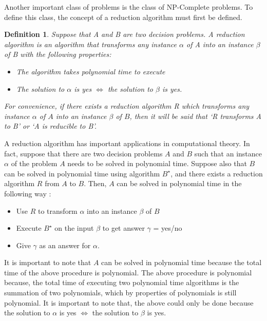 \documentclass[12pt]{article}
\newtheorem{definition}{Definition}[subsection]
\numberwithin{equation}{subsection}
\numberwithin{table}{subsection}
\numberwithin{algorithm}{subsection}
\begin{document}
Another important class of problems is the class of NP-Complete problems. To define this class, the concept of a reduction algorithm must first be defined.
\begin{definition}
\label{reduction_algorithm}
Suppose that A and B are two decision problems. A reduction algorithm is an algorithm that transforms any instance $\alpha$ of A into an instance $\beta$ of B with the following properties:
\begin{itemize}
   \item The algorithm takes polynomial time to execute
   \item The solution to $\alpha$ is yes $\iff$ the solution to $\beta$ is yes.
\end{itemize} 
For convenience, if there exists a reduction algorithm R which transforms any instance $\alpha$ of $A$ into an instance $\beta$ of $B$, then it will be said that `R transforms A to B' or `A is reducible to B'. {}
\end{definition}
A reduction algorithm has important applications in computational theory. In fact, suppose that there are two decision problems $\mathit{A}$ and $\mathit{B}$ such that an instance $\mathit{\alpha}$ of the problem $\mathit{A}$ needs to be solved in polynomial time. Suppose also that $\mathit{B}$ can be solved in polynomial time using algorithm $\mathit{B^\star}$, and there exists a reduction algorithm $\mathit{R}$ from $\mathit{A}$ to $\mathit{B}$. Then, $\mathit{A}$ can be solved in polynomial time in the following way :
 \begin{itemize}
	\item Use $\mathit{R}$ to transform $\mathit{\alpha}$ into an instance $\mathit{\beta}$ of $\mathit{B}$
	\item Execute $\mathit{B^\star}$ on the input $\beta$ to get answer $\gamma$ = yes/no
	\item Give $\mathit{\gamma}$ as an answer for $\mathit{\alpha}$.
\end{itemize} 
It is important to note that $\mathit{A}$ can be solved in polynomial time because the total time of the above procedure is polynomial. The above procedure is polynomial because, the total time of executing two polynomial time algorithms is the summation of two polynomials, which by properties of polynomials is still polynomial. It is important to note that, the above could only be done because the solution to $\alpha$ is yes $\iff$ the solution to $\beta$ is yes. \cite{cormen_leiserson_rivest_stein}\\\\
\end{document}
